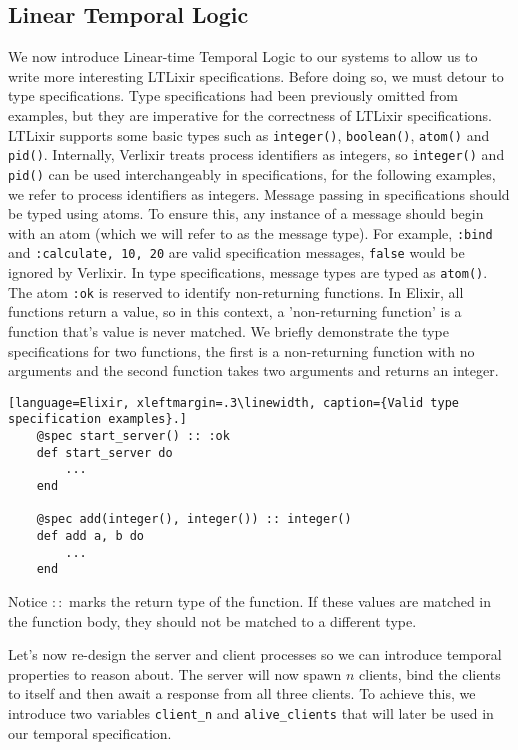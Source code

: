 \subsection{Linear Temporal Logic}
We now introduce Linear-time Temporal Logic to our systems to allow us to write more interesting LTLixir specifications. Before doing so, we must detour to type specifications. Type specifications had been previously omitted from examples, but they are imperative for the correctness of LTLixir specifications. LTLixir supports some basic types such as \texttt{integer()}, \texttt{boolean()}, \texttt{atom()} and \texttt{pid()}. Internally, Verlixir treats process identifiers as integers, so \texttt{integer()} and \texttt{pid()} can be used interchangeably in specifications, for the following examples, we refer to process identifiers as integers. Message passing in specifications should be typed using atoms. To ensure this, any instance of a message should begin with an atom (which we will refer to as the message type). For example, \texttt{{:bind}} and \texttt{{:calculate, 10, 20}} are valid specification messages, \texttt{{false}} would be ignored by Verlixir. In type specifications, message types are typed as \texttt{atom()}. The atom \texttt{:ok} is reserved to identify non-returning functions. In Elixir, all functions return a value, so in this context, a 'non-returning function' is a function that's value is never matched. We briefly demonstrate the type specifications for two functions, the first is a non-returning function with no arguments and the second function takes two arguments and returns an integer.
\begin{lstlisting}[language=Elixir, xleftmargin=.3\linewidth, caption={Valid type specification examples}.]
    @spec start_server() :: :ok
    def start_server do
        ...
    end

    @spec add(integer(), integer()) :: integer()
    def add a, b do
        ...
    end
\end{lstlisting}
Notice $::$ marks the return type of the function. If these values are matched in the function body, they should not be matched to a different type.
\par
Let's now re-design the server and client processes so we can introduce temporal properties to reason about. The server will now spawn $n$ clients, bind the clients to itself and then await a response from all three clients. To achieve this, we introduce two variables \texttt{client\_n} and \texttt{alive\_clients} that will later be used in our temporal specification.

